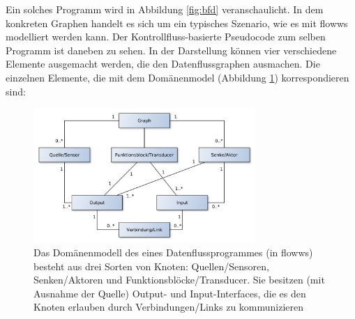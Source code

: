 Ein solches Programm wird in Abbildung \ref{fig:bfd} veranschaulicht. In dem konkreten Graphen handelt es sich um ein typisches Szenario, wie es mit flowws modelliert werden kann. Der Kontrollfluss-basierte Pseudocode zum selben Programm ist daneben zu sehen. In der Darstellung können vier verschiedene Elemente ausgemacht werden, die den Datenflussgraphen ausmachen. Die einzelnen Elemente, die mit dem Domänenmodel (Abbildung \ref{fig:bfddomainmodel}) korrespondieren sind:
\begin{figure}[h]
  \centering
  \includegraphics[width=0.75\textwidth]{bilder/chapter4/chapter4_2/domainmodelldatenfluss.pdf}
  \caption{Das Domänenmodell des eines Datenflussprogrammes (in flowws) besteht aus drei Sorten von Knoten: Quellen/Sensoren, Senken/Aktoren und Funktionsblöcke/Transducer. Sie besitzen (mit Ausnahme der Quelle) Output- und Input-Interfaces, die es den Knoten erlauben durch Verbindungen/Links zu kommunizieren}
  \label{fig:bfddomainmodel}
\end{figure}
